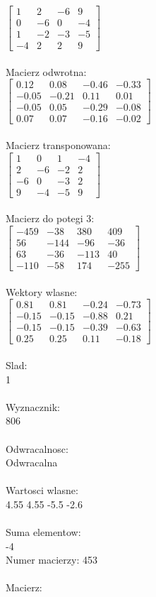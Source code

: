 \documentclass[a4paper,12pt]{article}
\begin{document}
$\begin{bmatrix} 1&2&-6&9\\0&-6&0&-4\\1&-2&-3&-5\\-4&2&2&9 \end{bmatrix}$
\\
\\
Macierz odwrotna:\\

$\begin{bmatrix} 0.12&0.08&-0.46&-0.33\\-0.05&-0.21&0.11&0.01\\-0.05&0.05&-0.29&-0.08\\0.07&0.07&-0.16&-0.02 \end{bmatrix}$
\\
\\
Macierz transponowana:\\

$\begin{bmatrix} 1&0&1&-4\\2&-6&-2&2\\-6&0&-3&2\\9&-4&-5&9 \end{bmatrix}$
\\
\\
Macierz do potegi 3:\\

$\begin{bmatrix} -459&-38&380&409\\56&-144&-96&-36\\63&-36&-113&40\\-110&-58&174&-255 \end{bmatrix}$
\\
\\
Wektory wlasne:\\

$\begin{bmatrix} 0.81&0.81&-0.24&-0.73\\-0.15&-0.15&-0.88&0.21\\-0.15&-0.15&-0.39&-0.63\\0.25&0.25&0.11&-0.18 \end{bmatrix}$
\\
\\
Slad:\\
1
\\
\\
Wyznacznik:\\
806
\\
\\
Odwracalnosc:\\
Odwracalna
\\
\\
Wartosci wlasne:\\
4.55 4.55 -5.5 -2.6
\\
\\
Suma elementow:\\
-4
\\
\newpage
Numer macierzy:
453
\\
\\
Macierz:\\
\end{document}
